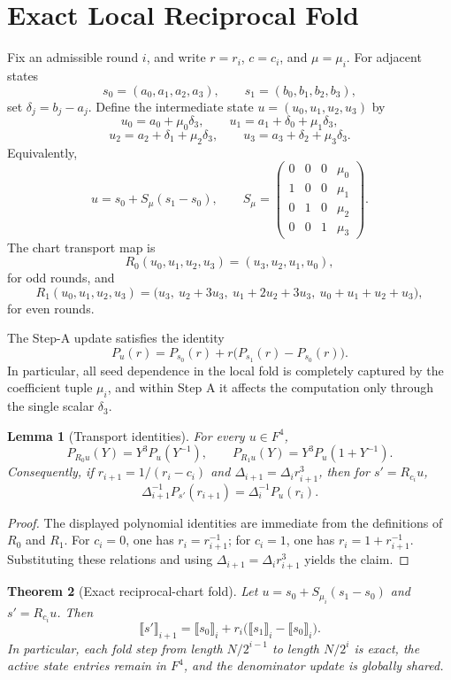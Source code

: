 \documentclass[11pt]{article}
\newtheorem{theorem}{Theorem}[section]
\newtheorem{lemma}[theorem]{Lemma}
\begin{document}
\section{Exact Local Reciprocal Fold}

Fix an admissible round \(i\), and write \(r=r_i\), \(c=c_i\), and \(\mu=\mu_i\). For adjacent states
\[
s_0=(a_0,a_1,a_2,a_3),
\qquad
s_1=(b_0,b_1,b_2,b_3),
\]
set \(\delta_j=b_j-a_j\). Define the intermediate state \(u=(u_0,u_1,u_2,u_3)\) by
\[
u_0=a_0+\mu_0\delta_3,
\qquad
u_1=a_1+\delta_0+\mu_1\delta_3,
\]
\[
u_2=a_2+\delta_1+\mu_2\delta_3,
\qquad
u_3=a_3+\delta_2+\mu_3\delta_3.
\]
Equivalently,
\[
u=s_0+S_{\mu}(s_1-s_0),
\qquad
S_{\mu}=
\begin{pmatrix}
0&0&0&\mu_0\\
1&0&0&\mu_1\\
0&1&0&\mu_2\\
0&0&1&\mu_3
\end{pmatrix}.
\]
The chart transport map is
\[
R_0(u_0,u_1,u_2,u_3)=(u_3,u_2,u_1,u_0),
\]
for odd rounds, and
\[
R_1(u_0,u_1,u_2,u_3)=
\big(u_3,\ u_2+3u_3,\ u_1+2u_2+3u_3,\ u_0+u_1+u_2+u_3\big),
\]
for even rounds.

The Step-A update satisfies the identity
\[
P_u(r)=P_{s_0}(r)+r\big(P_{s_1}(r)-P_{s_0}(r)\big).
\]
In particular, all seed dependence in the local fold is completely captured by the coefficient tuple \(\mu_i\), and within Step A it affects the computation only through the single scalar \(\delta_3\).

\begin{lemma}[Transport identities]
\label{lem:transport}
For every \(u\in F^4\),
\[
P_{R_0u}(Y)=Y^3P_u(Y^{-1}),
\qquad
P_{R_1u}(Y)=Y^3P_u(1+Y^{-1}).
\]
Consequently, if \(r_{i+1}=1/(r_i-c_i)\) and \(\Delta_{i+1}=\Delta_i r_{i+1}^3\), then for \(s'=R_{c_i}u\),
\[
\Delta_{i+1}^{-1}P_{s'}(r_{i+1})
=
\Delta_i^{-1}P_u(r_i).
\]
\end{lemma}

\begin{proof}
The displayed polynomial identities are immediate from the definitions of \(R_0\) and \(R_1\). For \(c_i=0\), one has \(r_i=r_{i+1}^{-1}\); for \(c_i=1\), one has \(r_i=1+r_{i+1}^{-1}\). Substituting these relations and using \(\Delta_{i+1}=\Delta_i r_{i+1}^3\) yields the claim.
\end{proof}

\begin{theorem}[Exact reciprocal-chart fold]
\label{thm:exact-fold}
Let \(u=s_0+S_{\mu_i}(s_1-s_0)\) and \(s'=R_{c_i}u\). Then
\[
\llbracket s'\rrbracket_{i+1}
=
\llbracket s_0\rrbracket_i+r_i\big(\llbracket s_1\rrbracket_i-\llbracket s_0\rrbracket_i\big).
\]
In particular, each fold step from length \(N/2^{i-1}\) to length \(N/2^i\) is exact, the active state entries remain in \(F^4\), and the denominator update is globally shared.
\end{theorem}
\end{document}
